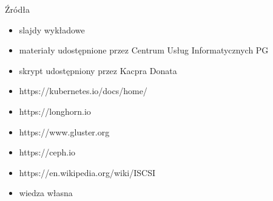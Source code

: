\documentclass[polish,envcountsect,10pt]{beamer}
\begin{document}
\begin{frame}{Źródła}
	\begin{itemize}
		\item slajdy wykładowe
		\item materiały udostępnione przez Centrum Usług Informatycznych PG
		\item skrypt udostępniony przez Kacpra Donata
		\item https://kubernetes.io/docs/home/
		\item https://longhorn.io
		\item https://www.gluster.org
		\item https://ceph.io
		\item https://en.wikipedia.org/wiki/ISCSI
		\item wiedza własna
	\end{itemize}
\end{frame}
\end{document}
